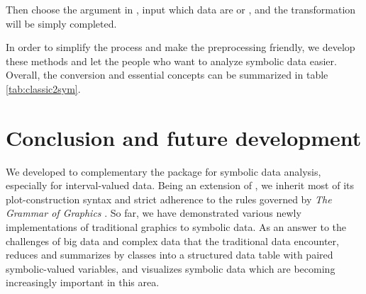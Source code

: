 \documentclass[article]{jss}
\begin{document}
Then choose the  argument in , input which data are  or , and the transformation will be simply completed.

In order to simplify the process and make the preprocessing friendly, we develop these methods and let the people who want to analyze symbolic data easier. Overall, the conversion and essential concepts can be summarized in table \ref{tab:classic2sym}. 

\begin{table}[t!]
\caption{\label{tab:classic2sym} Summary for  function.}
\end{table}%

 


\section{Conclusion and future development}\label{sec:conclusion}
We developed  to complementary the  package
for symbolic data analysis, especially for interval-valued data. Being
an extension of , we inherit most of its plot-construction
syntax and strict adherence to the rules governed by \emph{The Grammar
of Graphics} \cite{wilkinson2012grammar}. So far, we have demonstrated
various newly implementations of traditional graphics to symbolic
data. As an answer to the challenges of big data and complex data that
the traditional data encounter,  reduces and summarizes by
classes into a structured data table with paired symbolic-valued
variables, and visualizes symbolic data which are becoming
increasingly important in this area.
\end{document}
